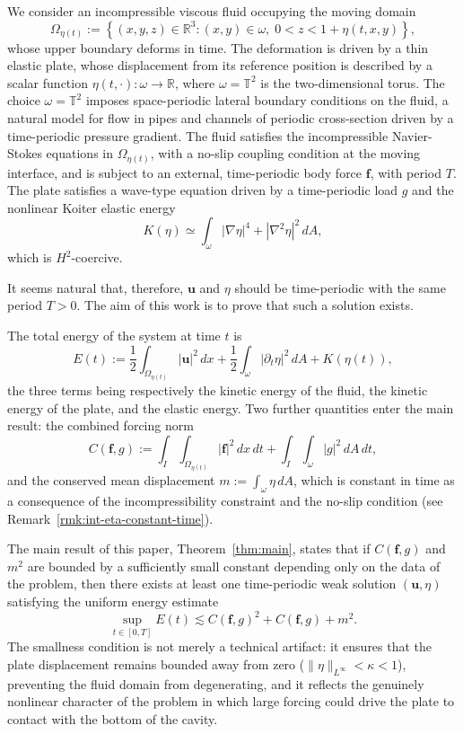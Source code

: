 \documentclass[10pt,a4paper]{article}
\numberwithin{equation}{section}
\begin{document}
We consider an incompressible viscous fluid occupying the moving domain
\[
\Omega_{\eta(t)} := \left\{ (x,y,z)\in\mathbb{R}^{3} : (x,y)\in\omega,\; 0 < z < 1+\eta(t,x,y) \right\},
\]
whose upper boundary deforms in time.
The deformation is driven by a thin elastic plate, whose displacement from its
reference position is described by a scalar function $\eta(t,\cdot):\omega\to\mathbb{R}$,
where $\omega = \mathbb{T}^2$ is the two-dimensional torus. The choice $\omega = \mathbb{T}^2$
imposes space-periodic lateral boundary conditions on the fluid, a natural model
for flow in pipes and channels of periodic cross-section driven by a time-periodic
pressure gradient. The fluid satisfies the incompressible Navier-Stokes equations
in $\Omega_{\eta(t)}$, with a no-slip coupling condition at the moving interface,
and is subject to an external, time-periodic body force $\mathbf{f}$, with period $T$. The plate satisfies a
wave-type equation driven by a time-periodic load $g$ and the nonlinear Koiter
elastic energy
\[
K(\eta) \simeq \int_\omega |\nabla\eta|^4 + |\nabla^2\eta|^2\,dA,
\]
which is $H^2$-coercive. 

It seems natural that, therefore, $\mathbf{u}$ and $\eta$ should be
time-periodic with the same period $T>0$.
The aim of this work is to prove that such a solution exists.



The total energy of the system at time $t$ is
\[
E(t) := \frac{1}{2}\int_{\Omega_{\eta(t)}} |\mathbf{u}|^2\,dx
       + \frac{1}{2}\int_\omega |\partial_t\eta|^2\,dA + K(\eta(t)),
\]
the three terms being respectively the kinetic energy of the fluid, the kinetic
energy of the plate, and the elastic energy. Two further quantities enter the
main result: the combined forcing norm
\[
C(\mathbf{f},g) := \int_{I}\!\!\int_{\Omega_{\eta(t)}} |\mathbf{f}|^2\,dx\,dt
                 + \int_{I}\!\!\int_\omega |g|^2\,dA\,dt,
\]
and the conserved mean displacement $m := \int_\omega \eta\,dA$, which is
constant in time as a consequence of the incompressibility constraint and the
no-slip condition (see Remark~\ref{rmk:int-eta-constant-time}).

The main result of this paper, Theorem~\ref{thm:main}, states that if $C(\mathbf{f},g)$
and $m^2$ are bounded by a sufficiently small constant depending only on the data of
the problem, then there exists at least one time-periodic weak solution $(\mathbf{u},\eta)$
satisfying the uniform energy estimate
\[
\sup_{t \in [0,T]} E(t) \lesssim C(\mathbf{f},g)^2 + C(\mathbf{f},g) + m^2.
\]
The smallness condition is not merely a technical artifact: it ensures that the plate
displacement remains bounded away from zero ($\|\eta\|_{L^\infty} < \kappa < 1$),
preventing the fluid domain from degenerating, and it reflects the genuinely nonlinear
character of the problem in which large forcing could drive the plate to contact with
the bottom of the cavity.
\end{document}
